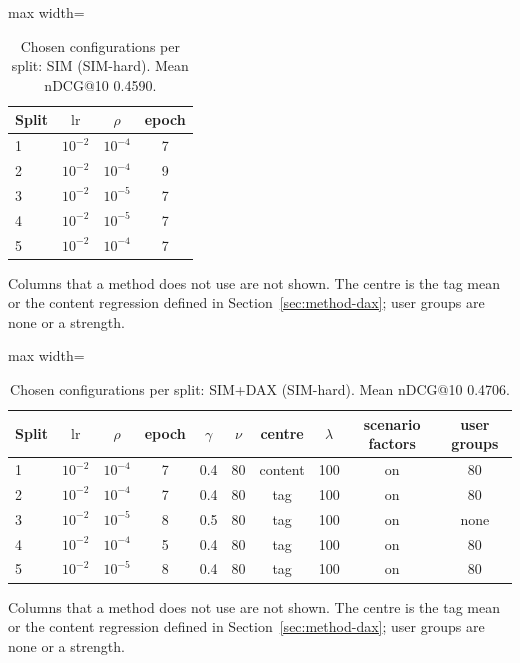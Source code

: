 \documentclass[preprint,12pt,authoryear]{elsarticle}
\begin{document}
\begin{table}[tbp]
\centering
\footnotesize
\caption{Chosen configurations per split: SIM (SIM-hard). Mean nDCG@10 0.4590.}
\label{tab:grid10}
\begin{adjustbox}{max width=\linewidth}
\begin{tabular}{lccc}
\toprule
Split & $\mathrm{lr}$ & $\rho$ & epoch \\
\midrule
1 & $10^{-2}$ & $10^{-4}$ & 7 \\
2 & $10^{-2}$ & $10^{-4}$ & 9 \\
3 & $10^{-2}$ & $10^{-5}$ & 7 \\
4 & $10^{-2}$ & $10^{-5}$ & 7 \\
5 & $10^{-2}$ & $10^{-4}$ & 7 \\
\bottomrule
\end{tabular}
\end{adjustbox}
\par\smallskip
\begin{minipage}{\linewidth}\raggedright\footnotesize Columns that a method does not use are not shown. The centre is the tag mean or the content regression defined in Section~\ref{sec:method-dax}; user groups are none or a strength.\end{minipage}
\end{table}

\begin{table}[tbp]
\centering
\footnotesize
\caption{Chosen configurations per split: SIM+DAX (SIM-hard). Mean nDCG@10 0.4706.}
\label{tab:grid11}
\begin{adjustbox}{max width=\linewidth}
\begin{tabular}{lccccccccc}
\toprule
Split & $\mathrm{lr}$ & $\rho$ & epoch & $\gamma$ & $\nu$ & centre & $\lambda$ & scenario factors & user groups \\
\midrule
1 & $10^{-2}$ & $10^{-4}$ & 7 & 0.4 & 80 & content & 100 & on & 80 \\
2 & $10^{-2}$ & $10^{-4}$ & 7 & 0.4 & 80 & tag & 100 & on & 80 \\
3 & $10^{-2}$ & $10^{-5}$ & 8 & 0.5 & 80 & tag & 100 & on & none \\
4 & $10^{-2}$ & $10^{-4}$ & 5 & 0.4 & 80 & tag & 100 & on & 80 \\
5 & $10^{-2}$ & $10^{-5}$ & 8 & 0.4 & 80 & tag & 100 & on & 80 \\
\bottomrule
\end{tabular}
\end{adjustbox}
\par\smallskip
\begin{minipage}{\linewidth}\raggedright\footnotesize Columns that a method does not use are not shown. The centre is the tag mean or the content regression defined in Section~\ref{sec:method-dax}; user groups are none or a strength.\end{minipage}
\end{table}
\end{document}

